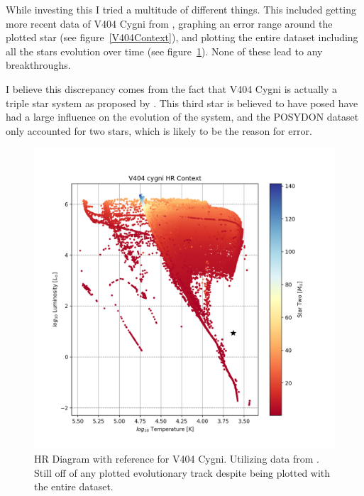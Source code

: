 \documentclass[12pt, a4paper]{article}
\begin{document}
            While investing this I tried a multitude of different things. This included getting more recent data of V404 Cygni from \parencite{Bartolomeo_2023}, graphing an error range around the plotted star (see figure~\ref{V404Context}), and plotting the entire dataset including all the stars evolution over time (see figure~\ref{V404FullContextTesting}). None of these lead to any breakthroughs. 

            I believe this discrepancy comes from the fact that V404 Cygni is actually a triple star system as proposed by \parencite{burdge_2024}. This third star is believed to have posed have had a large influence on the evolution of the system, and the POSYDON dataset only accounted for two stars, which is likely to be the reason for error.


            \begin{figure}[H] 
                \centering
                \includegraphics[scale = .6]{figs/GeneratedFigs/V404_Cygni/V404EntireDatasetPopulationHRComp.png}
                \caption{HR Diagram with reference for V404 Cygni. Utilizing data from \parencite{Bartolomeo_2023}. Still off of any plotted evolutionary track despite being plotted with the entire dataset.}
                \label{V404FullContextTesting}
            \end{figure}
\end{document}
